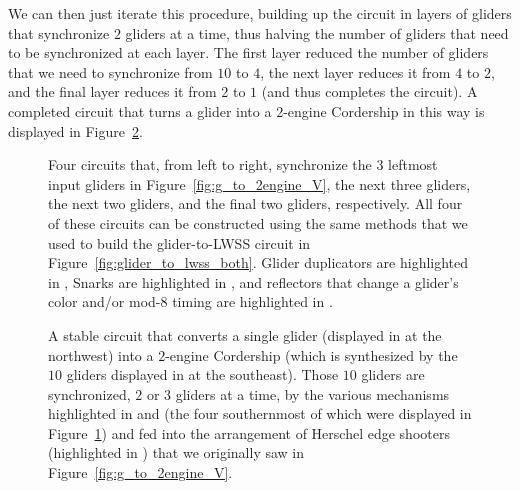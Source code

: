 \clearpage%


We can then just iterate this procedure, building up the circuit in layers of gliders that synchronize $2$ gliders at a time, thus halving the number of gliders that need to be synchronized at each layer. The first layer reduced the number of gliders that we need to synchronize from $10$ to $4$, the next layer reduces it from $4$ to $2$, and the final layer reduces it from $2$ to $1$ (and thus completes the circuit). A completed circuit that turns a glider into a $2$-engine Cordership in this way is displayed in Figure~\ref{fig:glider_to_2engine_cordership}.

\begin{figure}[!htb]
	\centering
	 \hfill {} \hfill {} \hfill {}
	\caption{Four circuits that, from left to right, synchronize the $3$ leftmost input gliders in Figure~\ref{fig:g_to_2engine_V}, the next three gliders, the next two gliders, and the final two gliders, respectively. All four of these circuits can be constructed using the same methods that we used to build the glider-to-LWSS circuit in Figure~\ref{fig:glider_to_lwss_both}. Glider duplicators are highlighted in , Snarks are highlighted in , and reflectors that change a glider's color and/or mod-$8$ timing are highlighted in .}\label{fig:2engine_synchronize}
\end{figure}

\begin{figure}[!htb]
	\centering
	\caption{A stable circuit that converts a single glider (displayed in  at the northwest) into a $2$-engine Cordership (which is synthesized by the $10$ gliders displayed in  at the southeast). Those $10$ gliders are synchronized, $2$ or $3$ gliders at a time, by the various mechanisms highlighted in  and  (the four southernmost of which were displayed in Figure~\ref{fig:2engine_synchronize}) and fed into the arrangement of Herschel edge shooters (highlighted in ) that we originally saw in Figure~\ref{fig:g_to_2engine_V}.}\label{fig:glider_to_2engine_cordership}\vspace*{0.2cm}
\end{figure}

